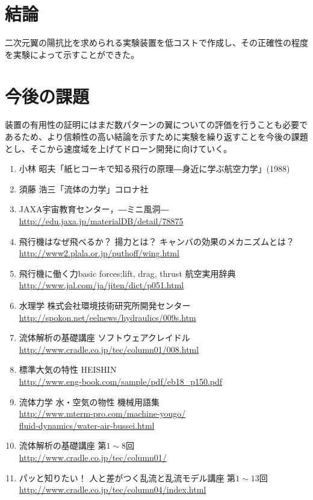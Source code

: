 \documentclass[11pt,b5paper,papersize,dvipdfmx]{jsbook}
\begin{document}
%
\section{結論}
二次元翼の陽抗比を求められる実験装置を低コストで作成し、その正確性の程度を実験によって示すことができた。

%
\section{今後の課題}
装置の有用性の証明にはまだ数パターンの翼についての評価を行うことも必要であるため、より信頼性の高い結論を示すために実験を繰り返すことを今後の課題とし、そこから速度域を上げてドローン開発に向けていく。

\clearpage

\sanko
\begin{enumerate}
  \item 小林 昭夫「紙ヒコーキで知る飛行の原理―身近に学ぶ航空力学」(1988)
  \item 須藤 浩三「流体の力学」コロナ社
  \item JAXA宇宙教育センター，―ミニ風洞―\\
    \url{http://edu.jaxa.jp/materialDB/detail/78875}
  \item 飛行機はなぜ飛べるか？ 揚力とは？ キャンバの効果のメカニズムとは？\\
    \url{http://www2.plala.or.jp/puthoff/wing.html}
  \item 飛行機に働く力basic forces;lift, drag, thrust 航空実用辞典\\
    \url{http://www.jal.com/ja/jiten/dict/p051.html}
  \item 水理学  株式会社環境技術研究所開発センター\\
    \url{http://spokon.net/eelnews/hydraulics/009s.htm}
  \item 流体解析の基礎講座 ソフトウェアクレイドル\\
    \url{http://www.cradle.co.jp/tec/column01/008.html}
  \item 標準大気の特性 HEISHIN\\
    \url{http://www.eng-book.com/sample/pdf/eb18_p150.pdf}
  \item 流体力学 水・空気の物性 機械用語集 \\
    \url{http://www.mterm-pro.com/machine-yougo/}\\
    \qquad\qquad\url{fluid-dynamics/water-air-bussei.html}
  \item 流体解析の基礎講座 第$1\sim8$回\\
    \url{http://www.cradle.co.jp/tec/column01/}
  \item パッと知りたい！ 人と差がつく乱流と乱流モデル講座 第$1\sim13$回\\
    \url{http://www.cradle.co.jp/tec/column04/index.html}
\end{enumerate}
\end{document}
